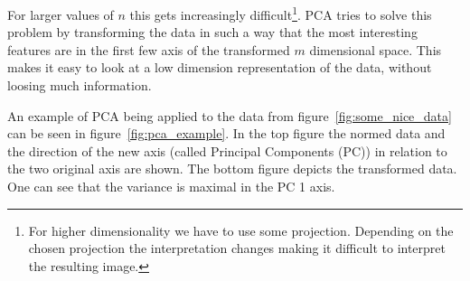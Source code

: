 \documentclass[a4paper]{IEEEtran}
\begin{document}
For larger values of $n$ this gets increasingly difficult\footnote{For higher dimensionality we have to use some projection. Depending on the chosen projection the interpretation changes making it difficult to interpret the resulting image.}. PCA tries to solve this problem by transforming the data in such a way that the most interesting features are in the first few axis of the transformed $m$ dimensional space. This makes it easy to look at a low dimension representation of the data, without loosing much information.

An example of PCA being applied to the data from figure~\ref{fig:some_nice_data} can be seen in figure~\ref{fig:pca_example}. In the top figure the normed data and the direction of the new axis (called Principal Components (PC)) in relation to the two original axis are shown. The bottom figure depicts the transformed data. One can see that the variance is maximal in the PC 1 axis.
\end{document}
